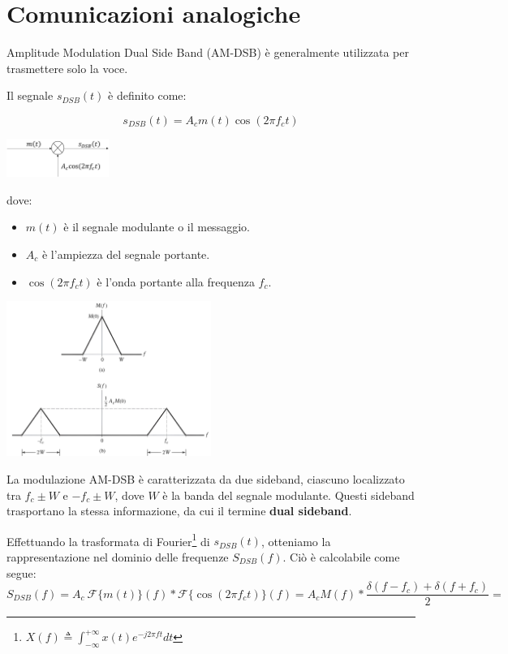 \section*{Comunicazioni analogiche}

Amplitude Modulation Dual Side Band (AM-DSB) è generalmente utilizzata per trasmettere solo la voce. 


Il segnale \( s_{DSB}(t) \) è definito come:

\begin{equation*}
s_{DSB}(t) = A_c m(t) \cos(2\pi f_c t)
\end{equation*}

\begin{center}
    \includegraphics[width=0.25\textwidth]{imgs/analog_pam_trasmitter.png}
\end{center}


dove:
\begin{itemize}
    \item \( m(t) \) è il segnale modulante o il messaggio.
    \item \( A_c \) è l'ampiezza del segnale portante.
    \item \( \cos(2\pi f_c t) \) è l'onda portante alla frequenza \( f_c \).
\end{itemize}

\begin{center}
    \includegraphics[width=0.5\textwidth]{imgs/dsb.jpg}
\end{center}


La modulazione AM-DSB è caratterizzata da due sideband, ciascuno localizzato tra \( f_c \pm W \) e \( -f_c \pm W \), dove \( W \) è la banda del segnale modulante. Questi sideband trasportano la stessa informazione, da cui il termine \textbf{dual sideband}.

Effettuando la trasformata di Fourier\footnote{$X(f) \triangleq \int_{-\infty}^{+\infty} x(t) e^{-j2\pi ft} dt$} di \( s_{DSB}(t) \), otteniamo la rappresentazione nel dominio delle frequenze \( S_{DSB}(f) \). Ciò è calcolabile come segue:
\[  
    S_{DSB}(f) = A_c \ \mathcal{F}\{m(t)\} (f)  \ast \mathcal{F}\{\cos(2\pi f_c t) \}(f) = A_c M(f) \ast \frac{\delta(f - f_c) + \delta(f + f_c)}{2} =
\]

